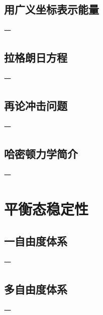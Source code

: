 \subsection{用广义坐标表示能量}

一

\subsection{拉格朗日方程}

一

\subsection{再论冲击问题}

一

\subsection{哈密顿力学简介}

一

\section{平衡态稳定性}

\subsection{一自由度体系}

一

\subsection{多自由度体系}

一
